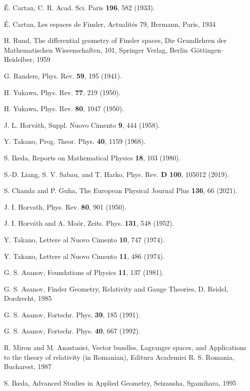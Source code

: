 \documentclass[aps,superscriptaddress, showpacs,preprintnumbers, superscriptaddress, nofootinbibt,twocolumn]{revtex4-2}
\begin{document}
\begin{thebibliography}{99}
\'{E}. Cartan,  C. R. Acad. Sci. Paris {\bf 196}, 582 (1933).

 \'{E}. Cartan, Les espaces de Finsler, Actualit\'{e}s 79, Hermann, Paris, 1934

 H. Rund,  The differential geometry of Finsler spaces, Die Grundlehren der Mathematischen Wissenschaften, 101, Springer Verlag,  Berlin–G\"{o}ttingen–Heidelber, 1959

 G. Randers, Phys. Rev. \textbf{59}, 195 (1941).

 H. Yukawa, Phys. Rev. {\bf 77},  219 (1950).

 H. Yukawa, Phys. Rev. {\bf 80},  1047 (1950).

 J. L. Horv\'{a}th, Suppl. Nuovo Cimento {\bf 9}, 444 (1958).

 Y. Takano, Prog. 7heor. Phys. {\bf 40}, 1159 (1968).

 S. Ikeda, Reports on Mathematical Physics {\bf 18}, 103 (1980).

 S.-D. Liang, S. V. Sabau, and T. Harko, Phys. Rev. {\bf D 100}, 105012 (2019).

 S. Chanda and P. Guha, The European Physical Journal Plus {\bf 136}, 66 (2021).

 J. I. Horvath, Phys. Rev. {\bf 80}, 901 (1950).

 J. I. Horv\'{a}th and A. Mo\'{o}r, Zeits. Phys. {\bf 131}, 548 (1952).

 Y. Takano, Lettere al Nuovo Cimento {\bf 10}, 747 (1974).

 Y. Takano, Lettere al Nuovo Cimento {\bf 11}, 486 (1974).

 G. S. Asanov, Foundations of Physics {\bf  11}, 137 (1981).

 G. S. Asanov, Finder Geometry, Relativity and Gauge Theories, D. Reidel, Dordrecht, 1985

 G. S. Asanov, Fortschr. Phys. {\bf 39}, 185 (1991).

 G. S. Asanov, Fortschr. Phys. {\bf 40}, 667 (1992).

 R. Miron and M. Anastasiei, Vector bundles, Lagrangre spaces, and Applications to the theory of relativity (in Romanian), Editura Academiei R. S. Romania, Bucharest, 1987

 S. Ikeda, Advanced Studies in Applied Geometry, Seizansha, Sgamihara, 1995


\end{thebibliography}
\end{document}
